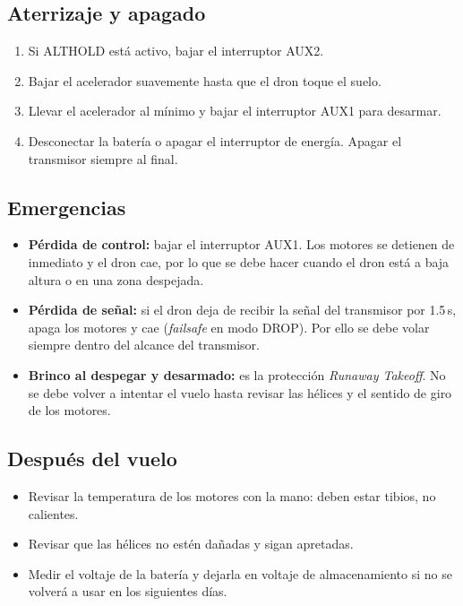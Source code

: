 \documentclass[pdflatex,sn-mathphys-num]{sn-jnl}%
\begin{document}
\subsection{Aterrizaje y apagado}
\begin{enumerate}[nosep]
    \item Si ALTHOLD está activo, bajar el interruptor AUX2.
    \item Bajar el acelerador suavemente hasta que el dron toque el suelo.
    \item Llevar el acelerador al mínimo y bajar el interruptor AUX1 para desarmar.
    \item Desconectar la batería o apagar el interruptor de energía. Apagar el transmisor siempre al final.
\end{enumerate}

\subsection{Emergencias}
\begin{itemize}[nosep]
    \item \textbf{Pérdida de control:} bajar el interruptor AUX1. Los motores se detienen de inmediato y el dron cae, por lo que se debe hacer cuando el dron está a baja altura o en una zona despejada.
    \item \textbf{Pérdida de señal:} si el dron deja de recibir la señal del transmisor por 1.5\,s, apaga los motores y cae (\textit{failsafe} en modo DROP). Por ello se debe volar siempre dentro del alcance del transmisor.
    \item \textbf{Brinco al despegar y desarmado:} es la protección \textit{Runaway Takeoff}. No se debe volver a intentar el vuelo hasta revisar las hélices y el sentido de giro de los motores.
\end{itemize}

\subsection{Después del vuelo}
\begin{itemize}[nosep]
    \item Revisar la temperatura de los motores con la mano: deben estar tibios, no calientes.
    \item Revisar que las hélices no estén dañadas y sigan apretadas.
    \item Medir el voltaje de la batería y dejarla en voltaje de almacenamiento si no se volverá a usar en los siguientes días.
\end{itemize}
\end{document}
